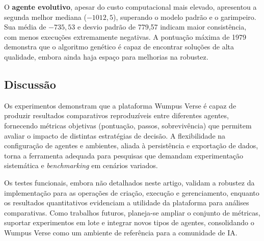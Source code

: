 O \textbf{agente evolutivo}, apesar do custo computacional mais elevado, apresentou a segunda melhor mediana ($-1012,5$), superando o modelo padrão e o garimpeiro. Sua média de $-735,53$ e desvio padrão de 779,57 indicam maior consistência, com menos execuções extremamente negativas. A pontuação máxima de 1979 demonstra que o algoritmo genético é capaz de encontrar soluções de alta qualidade, embora ainda haja espaço para melhorias na robustez.

\subsection{Discussão}

Os experimentos demonstram que a plataforma Wumpus Verse é capaz de produzir resultados comparativos reproduzíveis entre diferentes agentes, fornecendo métricas objetivas (pontuação, passos, sobrevivência) que permitem avaliar o impacto de distintas estratégias de decisão. A flexibilidade na configuração de agentes e ambientes, aliada à persistência e exportação de dados, torna a ferramenta adequada para pesquisas que demandam experimentação sistemática e \textit{benchmarking} em cenários variados.

Os testes funcionais, embora não detalhados neste artigo, validam a robustez da implementação para as operações de criação, execução e gerenciamento, enquanto os resultados quantitativos evidenciam a utilidade da plataforma para análises comparativas. Como trabalhos futuros, planeja-se ampliar o conjunto de métricas, suportar experimentos em lote e integrar novos tipos de agentes, consolidando o Wumpus Verse como um ambiente de referência para a comunidade de IA.